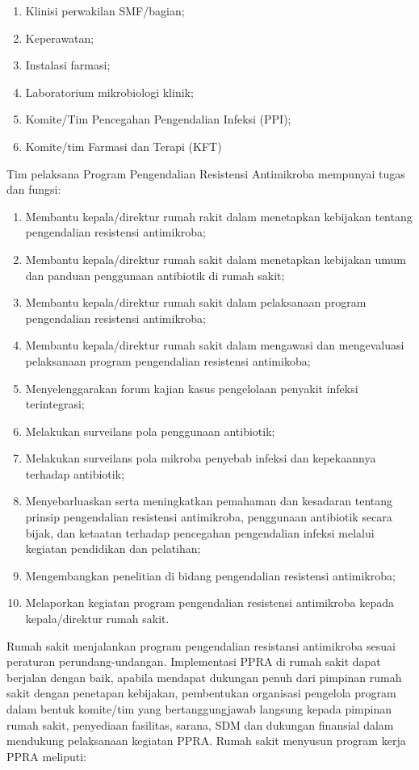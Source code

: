 \documentclass[
]{book}
\providecommand{\tightlist}{%
  \setlength{\itemsep}{0pt}\setlength{\parskip}{0pt}}
\begin{document}
\begin{enumerate}
\def\labelenumi{\arabic{enumi}.}
\tightlist
\item
  Klinisi perwakilan SMF/bagian;
\item
  Keperawatan;
\item
  Instalasi farmasi;
\item
  Laboratorium mikrobiologi klinik;
\item
  Komite/Tim Pencegahan Pengendalian Infeksi (PPI);
\item
  Komite/tim Farmasi dan Terapi (KFT)
\end{enumerate}

Tim pelaksana Program Pengendalian Resistensi Antimikroba mempunyai tugas dan fungsi:

\begin{enumerate}
\def\labelenumi{\alph{enumi}.}
\tightlist
\item
  Membantu kepala/direktur rumah rakit dalam menetapkan kebijakan tentang pengendalian resistensi antimikroba;
\item
  Membantu kepala/direktur rumah sakit dalam menetapkan kebijakan umum dan panduan penggunaan antibiotik di rumah sakit;
\item
  Membantu kepala/direktur rumah sakit dalam pelaksanaan program pengendalian resistensi antimikroba;
\item
  Membantu kepala/direktur rumah sakit dalam mengawasi dan mengevaluasi pelaksanaan program pengendalian resistensi antimikoba;
\item
  Menyelenggarakan forum kajian kasus pengelolaan penyakit infeksi terintegrasi;
\item
  Melakukan surveilans pola penggunaan antibiotik;
\item
  Melakukan surveilans pola mikroba penyebab infeksi dan kepekaannya terhadap antibiotik;
\item
  Menyebarluaskan serta meningkatkan pemahaman dan kesadaran tentang prinsip pengendalian resistensi antimikroba, penggunaan antibiotik secara bijak, dan ketaatan terhadap pencegahan pengendalian infeksi melalui kegiatan pendidikan dan pelatihan;
\item
  Mengembangkan penelitian di bidang pengendalian resistensi antimikroba;
\item
  Melaporkan kegiatan program pengendalian resistensi antimikroba kepada kepala/direktur rumah sakit.
\end{enumerate}

Rumah sakit menjalankan program pengendalian resistansi antimikroba sesuai peraturan perundang-undangan. Implementasi PPRA di rumah sakit dapat berjalan dengan baik, apabila mendapat dukungan penuh dari pimpinan rumah sakit dengan penetapan kebijakan, pembentukan organisasi pengelola program dalam bentuk komite/tim yang bertanggungjawab langsung kepada pimpinan rumah sakit, penyediaan fasilitas, sarana, SDM dan dukungan finansial dalam mendukung pelaksanaan kegiatan PPRA. Rumah sakit menyusun program kerja PPRA meliputi:
\end{document}
